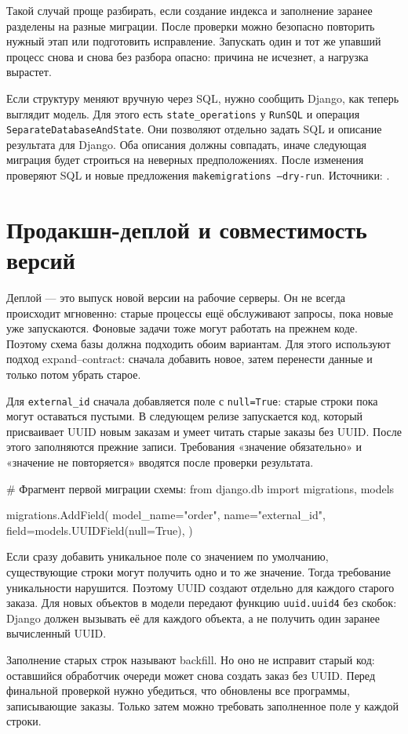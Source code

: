 \documentclass[11pt,a4paper]{article}
\newcommand{\src}[1]{{\small\color{muted}Источники: #1.}}
\newcommand{\parthead}[1]{\Needspace{10\baselineskip}\section{#1}}
\begin{document}
Такой случай проще разбирать, если создание индекса и заполнение заранее разделены на разные миграции. После проверки можно безопасно повторить нужный этап или подготовить исправление. Запускать один и тот же упавший процесс снова и снова без разбора опасно: причина не исчезнет, а нагрузка вырастет.

Если структуру меняют вручную через SQL, нужно сообщить Django, как теперь выглядит модель. Для этого есть \texttt{state\_operations} у \texttt{RunSQL} и операция \texttt{SeparateDatabase\allowbreak AndState}. Они позволяют отдельно задать SQL и описание результата для Django. Оба описания должны совпадать, иначе следующая миграция будет строиться на неверных предположениях. После изменения проверяют SQL и новые предложения \texttt{makemigrations --dry-run}.
\src{\cite{migrations,admin,operations,writing}}

\parthead{Продакшн-деплой и совместимость версий}

Деплой --- это выпуск новой версии на рабочие серверы. Он не всегда происходит мгновенно: старые процессы ещё обслуживают запросы, пока новые уже запускаются. Фоновые задачи тоже могут работать на прежнем коде. Поэтому схема базы должна подходить обоим вариантам. Для этого используют подход expand--contract: сначала добавить новое, затем перенести данные и только потом убрать старое.

Для \texttt{external\_id} сначала добавляется поле с \texttt{null=True}: старые строки пока могут оставаться пустыми. В следующем релизе запускается код, который присваивает UUID новым заказам и умеет читать старые заказы без UUID. После этого заполняются прежние записи. Требования «значение обязательно» и «значение не повторяется» вводятся после проверки результата.
\begin{code}
# Фрагмент первой миграции схемы:
from django.db import migrations, models

migrations.AddField(
    model_name="order",
    name="external_id",
    field=models.UUIDField(null=True),
)
\end{code}
Если сразу добавить уникальное поле со значением по умолчанию, существующие строки могут получить одно и то же значение. Тогда требование уникальности нарушится. Поэтому UUID создают отдельно для каждого старого заказа. Для новых объектов в модели передают функцию \texttt{uuid.uuid4} без скобок: Django должен вызывать её для каждого объекта, а не получить один заранее вычисленный UUID.

Заполнение старых строк называют backfill. Но оно не исправит старый код: оставшийся обработчик очереди может снова создать заказ без UUID. Перед финальной проверкой нужно убедиться, что обновлены все программы, записывающие заказы. Только затем можно требовать заполненное поле у каждой строки.
\end{document}
